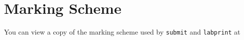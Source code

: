 \section{Marking Scheme}

You can view a copy of the marking scheme used by \texttt{submit} and \texttt{labprint} at\\
{\small {}}

















